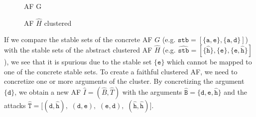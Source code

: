 \vspace{0.3cm}
\begin{figure}[h]
\begin{minipage}{.5\textwidth}
    \centering
    \caption{\ac{AF} G}
    \label{af:backgroundClusterExample1}
\end{minipage}%
\begin{minipage}{.5\textwidth}
    \centering
    \caption{\ac{AF} $\hat{H}$ clustered}
    \label{af:backgroundClusterExample2}
\end{minipage}
\end{figure}

If we compare the stable sets of the concrete AF $G$ (e.g. $\mathtt{stb=[\{a, e\}, \{a, d\}]}$) with the stable sets of the abstract clustered AF $\hat{H}$ (e.g. $\mathtt{\hat{stb}=[\{\hat{h}\}, \{e\}, \{e, \hat{h}\}]}$), we see that it is spurious due to the stable set $\mathtt{\{e\}}$ which cannot be mapped to one of the concrete stable sets. To create a faithful clustered AF, we need to concretize one or more arguments of the cluster. By concretizing the argument $\mathtt{\{d\}}$, we obtain a new AF $\hat{I}=(\hat{B}, \hat{T})$ with the arguments $\mathtt{\hat{B}=\{d, e, \hat{h}\}}$ and the attacks $\mathtt{\hat{T}=[(d, \hat{h}),}$
$\mathtt{(d, e),}$
$\mathtt{(e, d),}$
$\mathtt{(\hat{h}, \hat{h})]}.$

